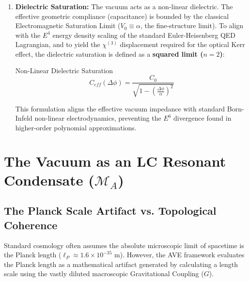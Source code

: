 \begin{enumerate}
    \item \textbf{Dielectric Saturation:} The vacuum acts as a non-linear dielectric. The effective geometric compliance (capacitance) is bounded by the classical Electromagnetic Saturation Limit ($V_0 \equiv \alpha$, the fine-structure limit). To align with the $E^4$ energy density scaling of the standard Euler-Heisenberg QED Lagrangian, and to yield the $\chi^{(3)}$ displacement required for the optical Kerr effect, the dielectric saturation is defined as a \textbf{squared limit ($n=2$)}:
    \begin{resultbox}{Non-Linear Dielectric Saturation}
    \begin{equation}
        C_{eff}(\Delta\phi) = \frac{C_0}{\sqrt{1 - \left(\frac{\Delta\phi}{\alpha}\right)^2}}
    \end{equation}
    \end{resultbox}
    This formulation aligns the effective vacuum impedance with standard Born-Infeld non-linear electrodynamics, preventing the $E^6$ divergence found in higher-order polynomial approximations.
\end{enumerate}

\section{The Vacuum as an LC Resonant Condensate ($\mathcal{M}_A$)}

\subsection{The Planck Scale Artifact vs. Topological Coherence}
Standard cosmology often assumes the absolute microscopic limit of spacetime is the Planck length ($\ell_P \approx 1.6 \times 10^{-35}$ m). However, the AVE framework evaluates the Planck length as a mathematical artifact generated by calculating a length scale using the vastly diluted macroscopic Gravitational Coupling ($G$).

